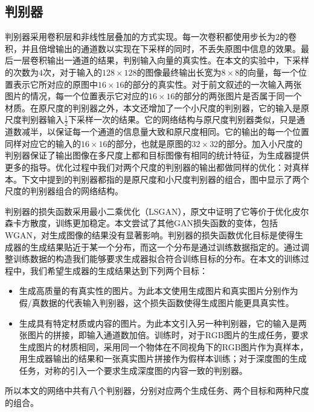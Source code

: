 \documentclass[UTF8,openany,AutoFakeBold,AutoFakeSlant,cs4size]{ctexbook}
\begin{document}
\subsection{判别器}

判别器采用卷积层和非线性层叠加的方式实现。每一次卷积都使用步长为$2$的卷积，并且倍增输出的通道数以实现在下采样的同时，不丢失原图中信息的效果。最后一层卷积输出一通道的结果，判别输入向量的真实性。在本文的实验中，下采样的次数为$4$次，对于输入的$128 \times 128$的图像最终输出长宽为$8\times8$的向量，每一个位置表示它所对应的原图中$16\times16$的部分的真实性。对于前文叙述的一次输入两张图片的情况，每一个位置表示它对应的$16\times16$的部分的两张图片是否属于同一个材质。在原尺度的判别器之外，本文还增加了一个小尺度的判别器，它的输入是原尺度判别器输入$\frac{1}{2}$下采样一次的结果。它的网络结构与原尺度判别器类似，只是通道数减半，以保证每一个通道的信息量大致和原尺度相同。它的输出的每一个位置同样对应它的输入的$16\times16$的部分，也就是原图的$32\times32$的部分。加入小尺度的判别器保证了输出图像在多尺度上都和目标图像有相同的统计特征，为生成器提供更多的指导。优化过程中我们对两个尺度的判别器的输出都做同样的优化：对真样本。下文中提到的判别器都指的是原尺度和小尺度判别器的组合，图中显示了两个尺度的判别器组合的网络结构。

判别器的损失函数采用最小二乘优化（LSGAN），原文中证明了它等价于优化皮尔森卡方散度，训练更加稳定。本文尝试了其他GAN损失函数的变体，包括WGAN，对生成图像的结果没有显著影响。判别器的损失函数优化目标是使得生成器的生成结果贴近于某一个分布，而这一个分布是通过训练数据指定的。通过调整训练数据的构造我们能够要求生成器拟合符合训练目标的分布。在本文的训练过程中，我们希望生成器的生成结果达到下列两个目标：

\begin{itemize}
	\item 生成高质量的有真实性的图片。为此本文使用生成图片和真实图片分别作为假/真数据的代表输入判别器，这个损失函数使得生成图片能更具真实性。
	\item 生成具有特定材质或内容的图片。为此本文引入另一种判别器，它的输入是两张图片的拼接，即输入通道数加倍。训练时，对于RGB图片的生成任务，要求生成图片的材质相同，采用同一个物体在不同视角下的RGB图片作为真样本，用生成器输出的结果和一张真实图片拼接作为假样本训练；对于深度图的生成任务，对称的引入一个要求生成深度图的内容一致的判别器。
\end{itemize}

所以本文的网络中共有八个判别器，分别对应两个生成任务、两个目标和两种尺度的组合。
\end{document}
